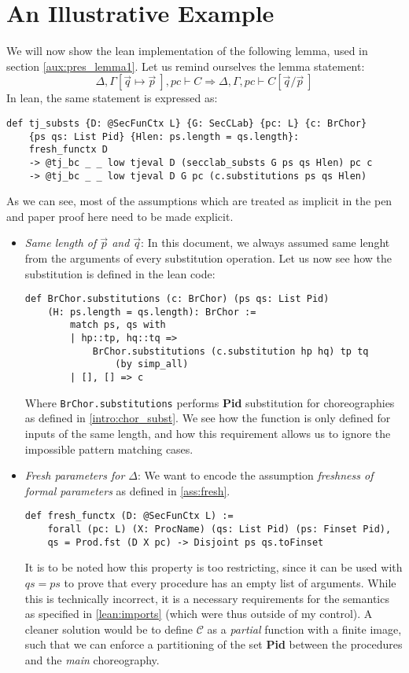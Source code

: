 \documentclass[12pt,a4paper,twoside]{book}
\begin{document}
\section{An Illustrative Example}
We will now show the lean implementation of the following lemma, used in section \ref{aux:pres_lemma1}. Let us remind ourselves the lemma statement:
\begin{equation*}
\Delta, \Gamma[\vec{q}\mapsto\vec{p}~], pc \vdash C \Longrightarrow
\Delta, \Gamma, pc \vdash C[\vec{q}/\vec{p}~]
\end{equation*}
In lean, the same statement is expressed as:
\begin{samepage}
\begin{verbatim}
def tj_substs {D: @SecFunCtx L} {G: SecCLab} {pc: L} {c: BrChor}
    {ps qs: List Pid} {Hlen: ps.length = qs.length}:
    fresh_functx D
    -> @tj_bc _ _ low tjeval D (secclab_substs G ps qs Hlen) pc c
    -> @tj_bc _ _ low tjeval D G pc (c.substitutions ps qs Hlen)
\end{verbatim}
\end{samepage}
As we can see, most of the assumptions which are treated as implicit in the pen and paper proof here need to be made explicit.
\begin{itemize}
\item \emph{Same length of $\vec{p}$ and $\vec{q}$}: In this document, we always assumed same lenght from the arguments of every substitution operation. Let us now see how the substitution is defined in the lean code:
\begin{verbatim}
def BrChor.substitutions (c: BrChor) (ps qs: List Pid)
    (H: ps.length = qs.length): BrChor :=
        match ps, qs with
        | hp::tp, hq::tq =>
            BrChor.substitutions (c.substitution hp hq) tp tq
                (by simp_all)
        | [], [] => c
\end{verbatim}
Where \texttt{BrChor.substitutions} performs \textbf{Pid} substitution for choreographies as defined in \ref{intro:chor_subst}.
We see how the function is only defined for inputs of the same length, and how this requirement allows us to ignore the impossible pattern matching cases.

\item \emph{Fresh parameters for $\Delta$}:
We want to encode the assumption \emph{freshness of formal parameters} as defined in \ref{ass:fresh}.
\begin{verbatim}
def fresh_functx (D: @SecFunCtx L) :=
    forall (pc: L) (X: ProcName) (qs: List Pid) (ps: Finset Pid),
    qs = Prod.fst (D X pc) -> Disjoint ps qs.toFinset
\end{verbatim}
It is to be noted how this property is too restricting, since it can be used with $qs = ps$ to prove that every procedure has an empty list of arguments. While this is technically incorrect, it is a necessary requirements for the semantics as specified in \ref{lean:imports} (which were thus outside of my control). A cleaner solution would be to define $\mathscr{C}$ as a \emph{partial} function with a finite image, such that we can enforce a partitioning of the set \textbf{Pid} between the procedures and the \emph{main} choreography.
\end{itemize}
\end{document}

